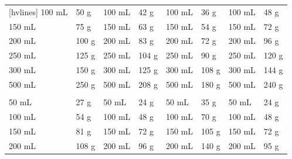 \begin{table}
\begin{NiceTabular}{*{8}{m{.1\textwidth}}}[hvlines]
		100 mL                                 & 50 g  & 100 mL                                  & 42 g  & 100 mL                                   & 36 g  & 100 mL                                      & 48 g  \\
		150 mL                                 & 75 g  & 150 mL                                  & 63 g  & 150 mL                                   & 54 g  & 150 mL                                      & 72 g  \\
		200 mL                                 & 100 g & 200 mL                                  & 83 g  & 200 mL                                   & 72 g  & 200 mL                                      & 96 g  \\
		250 mL                                 & 125 g & 250 mL                                  & 104 g & 250 mL                                   & 90 g  & 250 mL                                      & 120 g \\
		300 mL                                 & 150 g & 300 mL                                  & 125 g & 300 mL                                   & 108 g & 300 mL                                      & 144 g \\
		500 mL                                 & 250 g & 500 mL                                  & 208 g & 500 mL                                   & 180 g & 500 mL                                      & 240 g \\
		 &       &  &       &           &       &          \\
		50 mL                                  & 27 g  & 50 mL                                   & 24 g  & 50 mL                                    & 35 g  & 50 mL                                       & 24 g  \\
		100 mL                                 & 54 g  & 100 mL                                  & 48 g  & 100 mL                                   & 70 g  & 100 mL                                      & 48 g  \\
		150 mL                                 & 81 g  & 150 mL                                  & 72 g  & 150 mL                                   & 105 g & 150 mL                                      & 72 g  \\
		200 mL                                 & 108 g & 200 mL                                  & 96 g  & 200 mL                                   & 140 g & 200 mL                                      & 95 g  \\

\end{NiceTabular}
\end{table}
